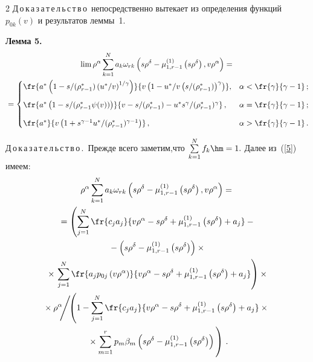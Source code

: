 \begin{multicols}{2}
\noindent
Д\,о\,к\,а\,з\,а\,т\,е\,л\,ь\,с\,т\,в\,о\
непосредственно вытекает из определения функций $p_{0k}(v)$ и результатов леммы~1.

\medskip

\noindent
\textbf{Лемма 5.} 
\begin{multline*}
\lim\rho^{\alpha} \sum\limits_{k=1}^N a_k\omega_{rk}\left(s\rho^{\delta}-\mu_{1,r-1}^{(1)}\left(s\rho^{\delta}\right),v
\rho^{\alpha}\right)={}\\
{}=
\begin{cases}
\fr{a^{*}\left(1-{s}/({\rho^*_{r-1}})\left({u^*}/{v}\right)^{{1}/{\gamma}}\right)}
{v\left(1-{u^*}/{v}\left({s}/({\rho^*_{r-1}})\right)^{\gamma}\right)},&\alpha<\fr{\gamma}{\gamma-1}\,;\\[9pt]
\fr{a^{*}\left(1-{s}/({\rho^*_{r-1}\psi(v)})\right)}{v-{s}/({\rho_{r-1}^*})-
{u^*s^{\gamma}}/{(\rho^{*}_{r-1})^{\gamma}}}\,,& \alpha=\fr{\gamma}{\gamma-1}\,;\\[9pt]
\fr{a^{*}}{v\left(1+{s^{\gamma-1}u^*}/{(\rho_{r-1}^*)^{\gamma-1}}\right)}\,,& \alpha>\fr{\gamma}{\gamma-1}\,.
\end{cases}
\end{multline*}


\noindent
Д\,о\,к\,а\,з\,а\,т\,е\,л\,ь\,с\,т\,в\,о\,.\
Прежде всего заметим,что $\sum\limits_{k=1}^Nf_k\hm=1.$
Далее из~(\ref{5}) имеем:
\begin{multline*}
\rho^{\alpha} \sum\limits_{k=1}^N a_k\omega_{rk}\left(s\rho^{\delta}-\mu_{1,r-1}^{(1)}\left(
s\rho^{\delta}\right),v\rho^{\alpha}\right)={}\\
{}=\left(\sum\limits_{j=1}^N\fr{c_ja_j}{v\rho^{\alpha}-
s\rho^{\delta}+\mu_{1,r-1}^{(1)}\left(
s\rho^{\delta}\right)+a_j}-{}\right.\\
{}-
\left(s\rho^{\delta}-\mu_{1,r-1}^{(1)}\left(s\rho^{\delta}\right)\right)\times{}\\
{}\times
\left.\sum\limits_{j=1}^N\fr{a_jp_{0j}\left(v\rho^{\alpha}\right)}
{v\rho^{\alpha}-s\rho^{\delta}+\mu_{1,r-1}^{(1)}\left(s\rho^{\delta}\right)+a_j}\right)\times{}\\
\!{}\times
{\rho^{\alpha}}\!\!\Bigg / \!\!
\left(1-\sum\limits_{j=1}^N\fr{c_ja_j}{v\rho^{\alpha}-s\rho^{\delta}+
\mu_{1,r-1}^{(1)}\left(s\rho^{\delta}\right)+a_j}\times{}\right.\\
\left.{}\times
\sum\limits_{m=1}^rp_m\beta_m\left(s\rho^{\delta}-\mu_{1,r-1}^{(1)}\left(
s\rho^{\delta}\right)\right)
\vphantom{\sum\limits_{j=1}^N\fr{c_ja_j}{v\rho^{\alpha}-s\rho^{\delta}+
\mu_{1,r-1}^{(1)}\left(s\rho^{\delta}\right)+a_j}}
\right)\,.
\end{multline*}


\end{multicols}
